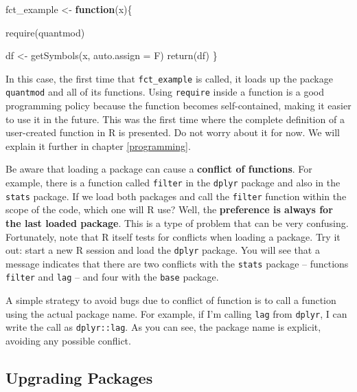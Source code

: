 \documentclass[
  12pt,
]{book}
\newenvironment{Shaded}{\begin{snugshade}}{\end{snugshade}}
\newcommand{\AttributeTok}[1]{\textcolor[rgb]{0.61,0.61,0.61}{#1}}
\newcommand{\ControlFlowTok}[1]{\textcolor[rgb]{0.27,0.27,0.27}{\textbf{#1}}}
\newcommand{\FunctionTok}[1]{\textcolor[rgb]{0,0,0}{#1}}
\newcommand{\NormalTok}[1]{#1}
\newcommand{\OtherTok}[1]{\textcolor[rgb]{0.37,0.37,0.37}{#1}}
\newenvironment{rmdcaution}
{\begin{cautionblock}
		
	} {\end{cautionblock}}
\begin{document}
\begin{Shaded}
\begin{Highlighting}[]
\NormalTok{fct\_example }\OtherTok{\textless{}{-}} \ControlFlowTok{function}\NormalTok{(x)\{}

  \FunctionTok{require}\NormalTok{(quantmod)}

\NormalTok{    df }\OtherTok{\textless{}{-}} \FunctionTok{getSymbols}\NormalTok{(x, }\AttributeTok{auto.assign =}\NormalTok{ F)}
    \FunctionTok{return}\NormalTok{(df)}
\NormalTok{\}}
\end{Highlighting}
\end{Shaded}

In this case, the first time that \texttt{fct\_example} is called, it loads up the package \texttt{quantmod} and all of its functions. Using \texttt{require} inside a function is a good programming policy because the function becomes self-contained, making it easier to use it in the future. This was the first time where the complete definition of a user-created function in R is presented. Do not worry about it for now. We will explain it further in chapter \ref{programming}.

\begin{rmdcaution}
Be aware that loading a package can cause a \textbf{conflict of
functions}. For example, there is a function called \texttt{filter} in
the \texttt{dplyr} package and also in the \texttt{stats} package. If we
load both packages and call the \texttt{filter} function within the
scope of the code, which one will R use? Well, the \textbf{preference is
always for the last loaded package}. This is a type of problem that can
be very confusing. Fortunately, note that R itself tests for conflicts
when loading a package. Try it out: start a new R session and load the
\texttt{dplyr} package. You will see that a message indicates that there
are two conflicts with the \texttt{stats} package -- functions
\texttt{filter} and \texttt{lag} -- and four with the \texttt{base}
package.

A simple strategy to avoid bugs due to conflict of function is to call a
function using the actual package name. For example, if I'm calling
\texttt{lag} from \texttt{dplyr}, I can write the call as
\texttt{dplyr::lag}. As you can see, the package name is explicit,
avoiding any possible conflict.
\end{rmdcaution}

\hypertarget{upgrading-packages}{%
\subsection{Upgrading Packages}\label{upgrading-packages}}
\end{document}
